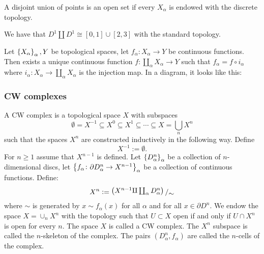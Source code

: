 \documentclass[11pt,a4paper]{article}
\begin{document}
\begin{example}
  A disjoint union of points is an open set if every $X_{\alpha}$ is endowed
  with the discrete topology.
\end{example}

\begin{example}
  We have that $D^1 \coprod D^1 \cong [0,1] \cup [2,3]$ with the standard
  topology.
\end{example}

\begin{proposition}
  Let $\set{X_{\alpha}}_{\alpha}, Y$ be topological spaces,
  let $f_{\alpha} \colon X_{\alpha} \to Y$ be continuous functions.
  Then exists a unique continuous function 
  $f \colon \coprod_{\alpha} X_{\alpha} \to Y$ such that
  $f_{\alpha} = f \circ i_{\alpha}$ where $i_{\alpha} \colon X_{\alpha} \to
  \coprod_{\alpha} X_{\alpha}$ is the injection map.
  In a diagram, it looks like this:
  \begin{center}
  \end{center}
\end{proposition}

\subsubsection{CW complexes}

\begin{definition}[CW complex]
  A CW complex is a topological space $X$ with subspaces
  \[
    \emptyset= X^{-1} \subseteq X^{0} \subseteq X^{1} \subseteq \cdots
    \subseteq X = \bigcup_{n} X^{n}
  \]
  such that the spaces $X^n$ are constructed inductively in the following
  way. Define
  \[
    X^{-1} := \emptyset.
  \]
  For $n \geq 1$ assume that $X^{n-1}$ is defined.
  Let $\set{D^n_{\alpha}}_{\alpha}$ be a collection of $n$-dimensional discs,
  let $\set{f_{\alpha} \colon \partial D^n_{\alpha} \to X^{n-1}}_{\alpha}$
  be a collection of continuous functions. Define:
  \[
    X^{n} := 
    \bigslant{\del{
    X^{n-1} \rotatebox[origin=c]{180}{$\Pi$} \coprod_{\alpha} D^n_{\alpha}
    }}
    {\sim}
  \]
  where $\sim$ is generated by $x \sim f_{\alpha}(x)$ for all $\alpha$ and
  for all $x \in \partial D^n$.
  We endow the space $X = \cup_{n} X^n$ with the topology such that 
  $U \subset X$ open if and only if $U \cap X^n$ is open for every $n$.
  The space $X$ is called a CW complex. The $X^n$ subspace is called the
  $n$-skeleton of the complex.
  The pairs $(D^n_{\alpha}, f_{\alpha})$ are called the $n$-cells of
  the complex.
\end{definition}
\end{document}
